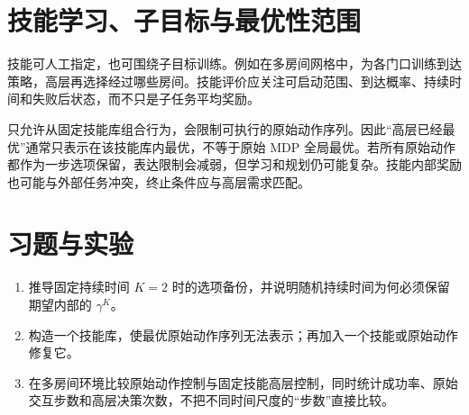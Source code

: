 \section{技能学习、子目标与最优性范围}

技能可人工指定，也可围绕子目标训练。例如在多房间网格中，为各门口训练到达策略，高层再选择经过哪些房间。技能评价应关注可启动范围、到达概率、持续时间和失败后状态，而不只是子任务平均奖励。

只允许从固定技能库组合行为，会限制可执行的原始动作序列。因此“高层已经最优”通常只表示在该技能库内最优，不等于原始 MDP 全局最优。若所有原始动作都作为一步选项保留，表达限制会减弱，但学习和规划仍可能复杂。技能内部奖励也可能与外部任务冲突，终止条件应与高层需求匹配。

\section{习题与实验}
\begin{enumerate}
\item 推导固定持续时间 $K=2$ 时的选项备份，并说明随机持续时间为何必须保留期望内部的 $\gamma^K$。
\item 构造一个技能库，使最优原始动作序列无法表示；再加入一个技能或原始动作修复它。
\item 在多房间环境比较原始动作控制与固定技能高层控制，同时统计成功率、原始交互步数和高层决策次数，不把不同时间尺度的“步数”直接比较。
\end{enumerate}





